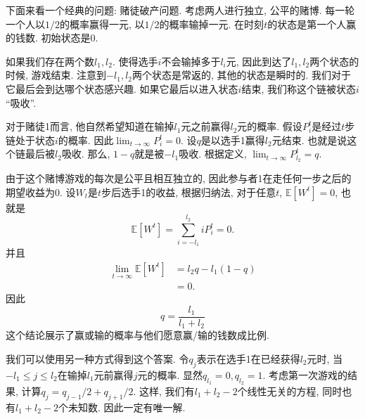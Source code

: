 \begin{example}
    下面来看一个经典的问题: 赌徒破产问题. 考虑两人进行独立, 公平的赌博. 每一轮一个人以$1/2$的概率赢得一元, 以$1/2$的概率输掉一元. 在时刻$t$的状态是第一个人赢的钱数. 初始状态是0. 
    
    如果我们存在两个数$l_1, l_2$. 使得选手$i$不会输掉多于$l_i$元, 因此到达了$l_1, l_2$两个状态的时候, 游戏结束. 注意到$-l_1, l_2$两个状态是常返的, 其他的状态是瞬时的. 我们对于它最后会到达哪个状态感兴趣. 如果它最后以进入状态$i$结束, 我们称这个链被状态$i$ ``吸收''. 
    
    对于赌徒1而言, 他自然希望知道在输掉$l_1$元之前赢得$l_2$元的概率. 假设$P_i^t$是经过$t$步链处于状态$i$的概率. 因此$\lim _{t \rightarrow \infty} P_i^t=0$. 设$q$是以选手1赢得$l_2$元结束. 也就是说这个链最后被$l_2$吸收. 那么, $1-q$就是被$-l_1$吸收. 根据定义, $\lim _{t \rightarrow \infty} P_{l_2}^t=q$.

    由于这个赌博游戏的每次是公平且相互独立的, 因此参与者1在走任何一步之后的期望收益为0. 设$W_t$是$t$步后选手1的收益, 根据归纳法, 对于任意$t$, $\mathbb{E}\left[W^t\right]=0$, 也就是
    $$\mathbb{E}\left[W^t\right]=\sum_{i=-l_1}^{l_2} i P_i^t=0.$$
    并且
    $$
\begin{aligned}
\lim _{t \rightarrow \infty} \mathbb{E}\left[W^t\right] & =l_2 q-l_1(1-q) \\
& =0 .
\end{aligned}
$$
因此
$$
q=\frac{l_1}{l_1+l_2}
$$
这个结论展示了赢或输的概率与他们愿意赢/输的钱数成比例. 

我们可以使用另一种方式得到这个答案. 令$q_j$表示在选手1在已经获得$l_2$元时, 当$-l_1\leq j\leq l_2$在输掉$l_1$元前赢得$j$元的概率. 显然$q_{l_1}=0,q_{l_2}=1. $ 考虑第一次游戏的结果, 计算$q_j=q_{j-1}/2 + q_{j+1}/2$. 这样, 我们有$l_1+l_2-2$个线性无关的方程, 同时也有$l_1+l_2-2$个未知数. 因此一定有唯一解. 

\end{example}